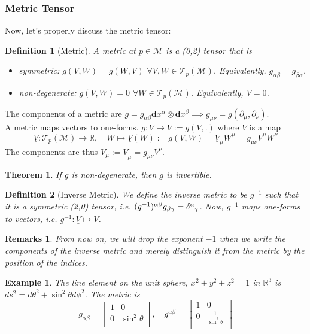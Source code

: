 \documentclass[a4paper]{article}
\newtheorem{eg}{Example}[section]
\newtheorem{remarks}{Remarks}[section]
\theoremstyle{new}
\newtheorem{defi}{Definition}[section]
\newtheorem{thm}{Theorem}[section]
\begin{document}
\subsubsection{Metric Tensor}
Now, let's properly discuss the metric tensor:
\begin{defi}[Metric]
A metric at $p\in\mathcal{M}$ is a (0,2) tensor that is
\begin{itemize}
    \item symmetric: $g(V,W)=g(W,V)$
    $\forall V,W\in\mathcal{T}_p(\mathcal{M})$. Equivalently, $g_{\alpha\beta}=g_{\beta\alpha}$.
    \item non-degenerate:
    $g(V,W)=0$     $\forall W\in\mathcal{T}_p(\mathcal{M})$. Equivalently, $V=0$.
\end{itemize}
\end{defi}
The components of a metric are $g=g_{\alpha\beta}\mathbf{d}x^\alpha\otimes\mathbf{d}x^\beta\implies g_{\mu\nu}=g(\partial_\mu,\partial_\nu)$.\\[10pt]
A metric maps vectors to one-forms. $g:V\mapsto \underline{V}:=g(V,.)$ where $\underline{V}$ is a map
$$\underline{V}:\mathcal{T}_p(\mathcal{M})\rightarrow\mathbb{R},\quad W\mapsto\underline{V}(W):=g(V,W)=\underline{V}_\mu W^\mu=g_{\mu\nu}V^\mu W^\nu$$
The components are thus $V_\mu:=\underline{V}_\mu=g_{\mu\nu}V^\nu$.
\begin{thm}
If $g$ is non-degenerate, then $g$ is invertible.
\end{thm}
\begin{defi}[Inverse Metric]
We define the inverse metric to be $g^{-1}$ such that it is a symmetric (2,0) tensor, i.e. $(g^{-1})^{\alpha\beta}g_{\beta\gamma}=\tensor*{\delta}{*_{}^{\alpha}_{\gamma}}$. Now,  $g^{-1}$ maps one-forms to vectors, i.e. $g^{-1}:\underline{V}\mapsto V$.
\end{defi}
\begin{remarks}
From now on, we will drop the exponent $−1$ when we write the components of the inverse metric and merely distinguish it from the metric by the position of the indices.
\end{remarks}
\begin{eg}
The line element on the unit sphere, $x^2+y^2+z^2=1$ in $\mathbb{R}^3$ is $ds^2=d\theta^2+\sin^2\theta d\phi^2$. The metric is
$$g_{\alpha\beta}=\begin{bmatrix}1&0\\0&\sin^2\theta\\\end{bmatrix},\quad g^{\alpha\beta}=\begin{bmatrix}1&0\\0&\frac{1}{\sin^2\theta}\\\end{bmatrix}$$
\end{eg}
\end{document}
